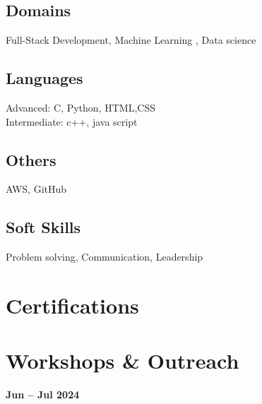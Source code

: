 \documentclass[]{deedy-resume-openfont}
\begin{document}
\begin{minipage}[t]{0.45\textwidth}
\subsection{Domains}
\vspace{4pt}
Full-Stack Development, Machine Learning , Data science\\
\vspace{8pt}
\subsection{Languages}
\vspace{4pt}
Advanced: C, Python, HTML,CSS\\
Intermediate: c++, java script\\

\vspace{6pt}
\subsection{Others}
\vspace{4pt}
AWS, GitHub\\
\vspace{6pt}
\subsection{Soft Skills}
\vspace{4pt}
Problem solving, Communication, Leadership



\vspace{4pt}

\section{Certifications}
\vspace{4pt}
\vspace{4pt}
\vspace{4pt}
\vspace{2pt}

\section{Workshops \& Outreach}
\vspace{2pt}
\vspace{4pt}
\textbf{{Jun – Jul 2024}
}

\end{minipage} 
\end{document}
